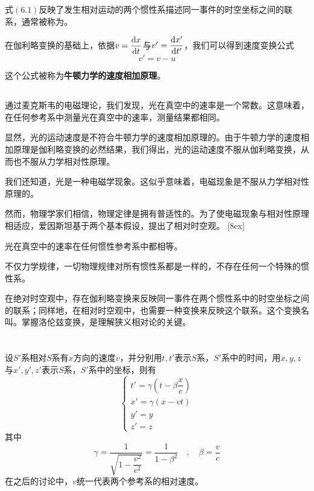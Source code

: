 式$(6.1)$反映了发生相对运动的两个惯性系描述同一事件的时空坐标之间的联系，通常被称为。

在伽利略变换的基础上，依据$v=\dfrac{\dif x}{\dif t}$与$v'=\dfrac{\dif x'}{\dif t'}$，我们可以得到速度变换公式
\begin{equation}
	v'=v-u
\end{equation}

这个公式被称为\textbf{牛顿力学的速度相加原理}。

\subsection[相对时空观]{}
通过麦克斯韦的电磁理论，我们发现，光在真空中的速率是一个常数。这意味着，在任何参考系中测量光在真空中的速率，测量结果都相同。

显然，光的运动速度是不符合牛顿力学的速度相加原理的。由于牛顿力学的速度相加原理是伽利略变换的必然结果，我们得出，光的运动速度不服从伽利略变换，从而也不服从力学相对性原理。

我们还知道，光是一种电磁学现象。这似乎意味着，电磁现象是不服从力学相对性原理的。

然而，物理学家们相信，物理定律是拥有普适性的。为了使电磁现象与相对性原理相适应，爱因斯坦基于两个基本假设，提出了相对时空观。
[8ex]
\begin{Itemize}
	\item {} 光在真空中的速率在任何惯性参考系中都相等。
	\item {} 不仅力学规律，一切物理规律对所有惯性系都是一样的，不存在任何一个特殊的惯性系。
\end{Itemize}

在绝对时空观中，存在伽利略变换来反映同一事件在两个惯性系中的时空坐标之间的联系；同样地，在相对时空观中，也需要一种变换来反映这个联系。这个变换名叫。掌握洛伦兹变换，是理解狭义相对论的关键。

\section[洛伦兹变换]{}
\begin {law}
	设$S'$系相对$S$系有$x$方向的速度$v$，并分别用$t,t'$表示$S$系，$S'$系中的时间，用$x,y,z$与$x',y',z'$表示$S$系，$S'$系中的坐标，则有
	\[\left\{\begin{array}{l}
		t'=\gamma(t-\beta\dfrac{x}{c})\\
		x'=\gamma(x-vt)\\
		y'=y\\
		z'=z
	\end{array}\right.\]
  其中
  \[
  	\gamma=\dfrac{1}{\sqrt{1-\dfrac{v^2}{c^2}}} = \dfrac{1}{1-\beta^2}\quad,\quad\beta=\dfrac{v}{c}
  \]
  在之后的讨论中，$v$统一代表两个参考系的相对速度。
\end{law}

